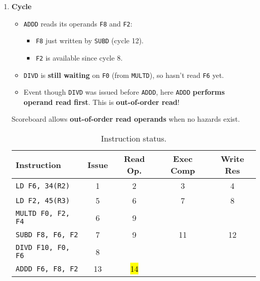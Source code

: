\begin{enumerate}
    \newpage


    \item \textbf{Cycle \theenumi}
    \begin{itemize}
        \item[\textcolor{Green3}{\faIcon{check}}] \texttt{ADDD} reads its operands \texttt{F8} and \texttt{F2}:
        \begin{itemize}
            \item \texttt{F8} just written by \texttt{SUBD} (cycle 12).
            \item \texttt{F2} is available since cycle 8.
        \end{itemize}
        \item[\textcolor{Red2}{\faIcon{times}}] \texttt{DIVD} is \textbf{still waiting} on \texttt{F0} (from \texttt{MULTD}), so hasn't read \texttt{F6} yet.
        \item[\textcolor{Green3}{\faIcon{\speedIcon}}] Event though \texttt{DIVD} was issued before \texttt{ADDD}, here \texttt{ADDD} \textbf{performs operand read first}. This is \textbf{out-of-order read}!
    \end{itemize}
    Scoreboard allows \textbf{out-of-order read operands} when no hazards exist.

    \begin{table}[!htp]
        \centering
        \begin{tabular}{@{} l | c c c c @{}}
            \toprule
            Instruction                 & Issue     & Read Op.  & Exec Comp & Write Res \\
            \midrule
            \texttt{LD    F6, 34(R2)}   & 1         & 2         & 3         & 4         \\ [.3em]
            \texttt{LD    F2, 45(R3)}   & 5         & 6         & 7         & 8         \\ [.3em]
            \texttt{MULTD F0, F2, F4}   & 6         & 9         &           &           \\ [.3em]
            \texttt{SUBD  F8, F6, F2}   & 7         & 9         & 11        & 12        \\ [.3em]
            \texttt{DIVD  F10, F0, F6}  & 8         &           &           &           \\ [.3em]
            \texttt{ADDD  F6, F8, F2}   & 13        & \hl{14}   &           &           \\
            \bottomrule
        \end{tabular}
        \caption*{Instruction status.}
    \end{table}


\end{enumerate}
